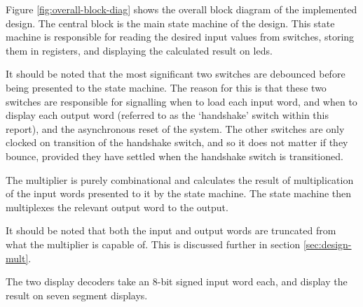 Figure \ref{fig:overall-block-diag} shows the overall block diagram of the implemented design. The central block is the main state machine of the design. This state machine is responsible for reading the desired input values from switches, storing them in registers, and displaying the calculated result on \glspl{led}.

It should be noted that the most significant two switches are debounced before being presented to the state machine. The reason for this is that these two switches are responsible for signalling when to load each input word, and when to display each output word (referred to as the `handshake' switch within this report), and the asynchronous reset of the system. The other switches are only clocked on transition of the handshake switch, and so it does not matter if they bounce, provided they have settled when the handshake switch is transitioned.

The multiplier is purely combinational and calculates the result of multiplication of the input words presented to it by the state machine. The state machine then multiplexes the relevant output word to the output.

It should be noted that both the input and output words are truncated from what the multiplier is capable of. This is discussed further in section \ref{sec:design-mult}.

The two display decoders take an 8-bit signed input word each, and display the result on seven segment displays.




